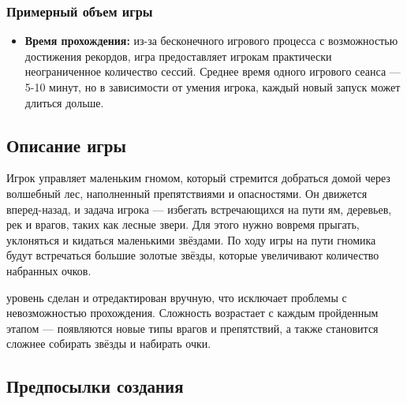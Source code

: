 \documentclass{article}
\begin{document}
\subsubsection{Примерный объем игры}
\begin{itemize}
    \item \textbf{Время прохождения:} из-за бесконечного игрового процесса с возможностью достижения рекордов, игра предоставляет игрокам практически неограниченное количество сессий. Среднее время одного игрового сеанса — 5-10 минут, но в зависимости от умения игрока, каждый новый запуск может длиться дольше.
\end{itemize}




\subsection{Описание игры}

Игрок управляет маленьким гномом, который стремится добраться домой через волшебный лес, наполненный препятствиями и опасностями. Он движется вперед-назад, и задача игрока — избегать встречающихся на пути ям, деревьев, рек и врагов, таких как лесные звери. Для этого нужно вовремя прыгать, уклоняться и кидаться маленькими звёздами. По ходу игры на пути гномика будут встречаться большие золотые звёзды, которые увеличивают количество набранных очков.

 уровень сделан и отредактирован вручную, что исключает проблемы с невозможностью прохождения. Сложность возрастает с каждым пройденным этапом — появляются новые типы врагов и препятствий, а также становится сложнее собирать звёзды и набирать очки.

\subsection{Предпосылки создания}
\end{document}
